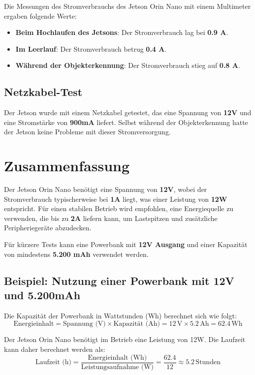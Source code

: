 \documentclass[12pt]{article}
\begin{document}
\begin{itemize}
Die Messungen des Stromverbrauchs des Jetson Orin Nano mit einem Multimeter 
ergaben folgende Werte:
\begin{itemize}
    \item \textbf{Beim Hochlaufen des Jetsons}: Der Stromverbrauch lag bei \textbf{0.9 A}.
    \item \textbf{Im Leerlauf}: Der Stromverbrauch betrug \textbf{0.4 A}.
    \item \textbf{Während der Objekterkennung}: Der Stromverbrauch stieg auf \textbf{0.8 A}.
\end{itemize}

\subsection*{Netzkabel-Test}

Der Jetson wurde mit einem Netzkabel getestet, das eine Spannung von \textbf{12V} und 
eine Stromstärke von \textbf{900mA} liefert. 
Selbst während der Objekterkennung hatte der Jetson keine Probleme mit dieser 
Stromversorgung.

    \end{itemize}
    \section{Zusammenfassung}

    Der Jetson Orin Nano benötigt eine Spannung von \textbf{12V}, wobei der 
    Stromverbrauch typischerweise bei \textbf{1A} liegt, was einer Leistung 
    von \textbf{12W} entspricht. Für einen stabilen Betrieb wird empfohlen, eine
    Energiequelle zu verwenden, die bis zu \textbf{2A} liefern kann, um Lastspitzen und 
    zusätzliche Peripheriegeräte abzudecken.
    
    Für kürzere Tests kann eine Powerbank mit \textbf{12V Ausgang} und einer 
    Kapazität von mindestens \textbf{5.200 mAh} verwendet werden. 
    
    \subsection*{Beispiel: Nutzung einer Powerbank mit 12V und 5.200mAh}
    
    Die Kapazität der Powerbank in Wattstunden (Wh) berechnet sich wie folgt:
    \[
    \text{Energieinhalt} = \text{Spannung (V)} \times \text{Kapazität (Ah)} = 12 \, \text{V} \times 5.2 \, \text{Ah} = 62.4 \, \text{Wh}
    \]
    
    Der Jetson Orin Nano benötigt im Betrieb eine Leistung von 12W. Die Laufzeit kann 
    daher berechnet werden als:
    \[
    \text{Laufzeit (h)} = \frac{\text{Energieinhalt (Wh)}}{\text{Leistungsaufnahme (W)}} = \frac{62.4}{12} \approx 5.2 \, \text{Stunden}
    \]
    
\end{document}
